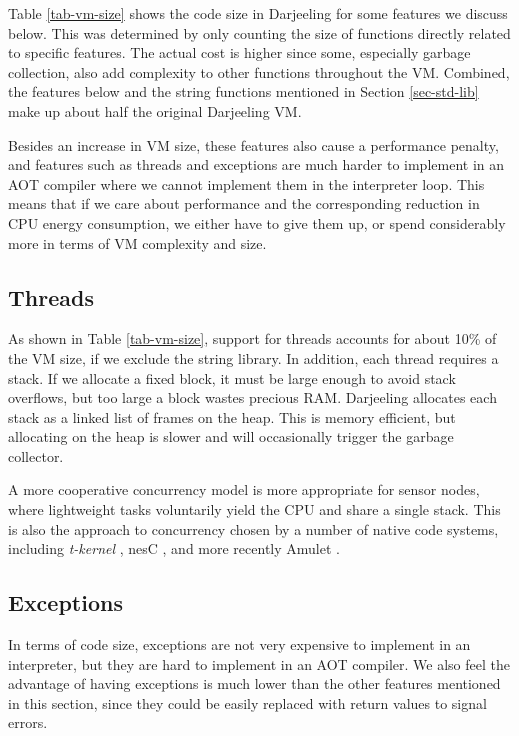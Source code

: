 Table \ref{tab-vm-size} shows the code size in Darjeeling for some features we discuss below. This was determined by only counting the size of functions directly related to specific features. The actual cost is higher since some, especially garbage collection, also add complexity to other functions throughout the VM. Combined, the features below and the string functions mentioned in Section \ref{sec-std-lib} make up about half the original Darjeeling VM.

Besides an increase in VM size, these features also cause a performance penalty, and features such as threads and exceptions are much harder to implement in an AOT compiler where we cannot implement them in the interpreter loop. This means that if we care about performance and the corresponding reduction in CPU energy consumption, we either have to give them up, or spend considerably more in terms of VM complexity and size.


\subsection{Threads}
As shown in Table \ref{tab-vm-size}, support for threads accounts for about 10\% of the VM size, if we exclude the string library. In addition, each thread requires a stack. If we allocate a fixed block, it must be large enough to avoid stack overflows, but too large a block wastes precious RAM. Darjeeling allocates each stack as a linked list of frames on the heap. This is memory efficient, but allocating on the heap is slower and will occasionally trigger the garbage collector.

A more cooperative concurrency model is more appropriate for sensor nodes, where lightweight tasks voluntarily yield the CPU and share a single stack. This is also the approach to concurrency chosen by a number of native code systems, including \emph{t-kernel} \cite{Gu:2005un}, nesC \cite{Gay:2003up}, and more recently Amulet \cite{Hester:2016je}.


\subsection{Exceptions}
In terms of code size, exceptions are not very expensive to implement in an interpreter, but they are hard to implement in an AOT compiler. We also feel the advantage of having exceptions is much lower than the other features mentioned in this section, since they could be easily replaced with return values to signal errors.


